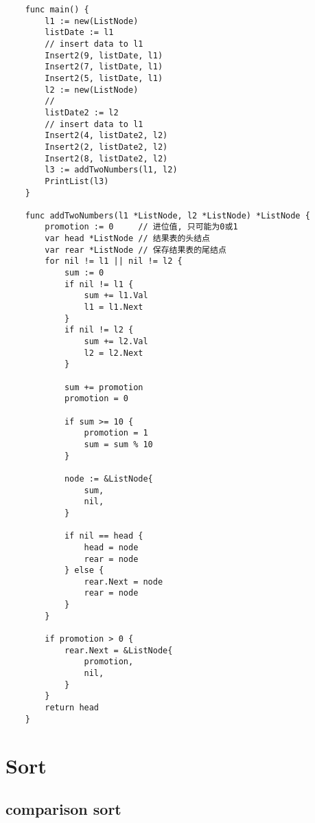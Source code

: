 \documentclass[oneside,12pt,twiside,a4paper]{ctexbook}
\begin{document}
\begin{lstlisting}
    func main() {
        l1 := new(ListNode)
        listDate := l1
        // insert data to l1
        Insert2(9, listDate, l1)
        Insert2(7, listDate, l1)
        Insert2(5, listDate, l1)
        l2 := new(ListNode)
        //
        listDate2 := l2
        // insert data to l1
        Insert2(4, listDate2, l2)
        Insert2(2, listDate2, l2)
        Insert2(8, listDate2, l2)
        l3 := addTwoNumbers(l1, l2)
        PrintList(l3)
    }
    
    func addTwoNumbers(l1 *ListNode, l2 *ListNode) *ListNode {
        promotion := 0     // 进位值, 只可能为0或1
        var head *ListNode // 结果表的头结点
        var rear *ListNode // 保存结果表的尾结点
        for nil != l1 || nil != l2 {
            sum := 0
            if nil != l1 {
                sum += l1.Val
                l1 = l1.Next
            }
            if nil != l2 {
                sum += l2.Val
                l2 = l2.Next
            }
    
            sum += promotion
            promotion = 0
    
            if sum >= 10 {
                promotion = 1
                sum = sum % 10
            }
    
            node := &ListNode{
                sum,
                nil,
            }
    
            if nil == head {
                head = node
                rear = node
            } else {
                rear.Next = node
                rear = node
            }
        }
    
        if promotion > 0 {
            rear.Next = &ListNode{
                promotion,
                nil,
            }
        }
        return head
    }    
\end{lstlisting}

\chapter{Sort}
\section{comparison sort}
%
\end{document}
